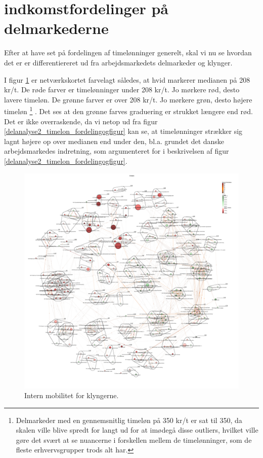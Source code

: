 %
\section{indkomstfordelinger på delmarkederne \label{sec delanalyse2 loen paa delmarkederne} }
%

Efter at have set på fordelingen af timelønninger generelt, skal vi nu se hvordan det er er differentiereret ud fra arbejdsmarkedets delmarkeder og klynger.  

I figur \ref{fig_analyse_deskriptivt_kort_timelon} er netværkskortet farvelagt således, at hvid markerer medianen på 208 kr/t. De røde farver er timelønninger under 208 kr/t. Jo mørkere rød, desto lavere timeløn. De grønne farver er over 208 kr/t. Jo mørkere grøn, desto højere timeløn%
%
\footnote{ Delmarkeder med en gennemsnitlig timeløn på 350 kr/t er sat til 350, da skalen ville blive spredt for langt ud for at imødegå disse outliers, hvilket ville gøre det svært at se nuancerne i forskellen mellem de timelønninger, som de fleste erhvervsgrupper trods alt har.}%
%
. Det ses at den grønne farves graduering er strukket længere end rød. Det er ikke overraskende, da vi netop ud fra figur \ref{delanalyse2_timelon_fordelingogfigur} kan se, at timelønninger strækker sig lagnt højere op over medianen end under den, bl.a. grundet det danske arbejdsmarkedes indretning, som argumenteret for i beskrivelsen af figur \ref{delanalyse2_timelon_fordelingogfigur}.

%
\begin{figure}[H]
\begin{center}
  \caption{Intern mobilitet for klyngerne.}
  \label{fig_analyse_deskriptivt_kort_timelon}
  \includegraphics[width=1.0\textwidth]{fig/netvaerkskort/kort_timelon.pdf}
\end{center}
\end{figure}
\restoregeometry
%

